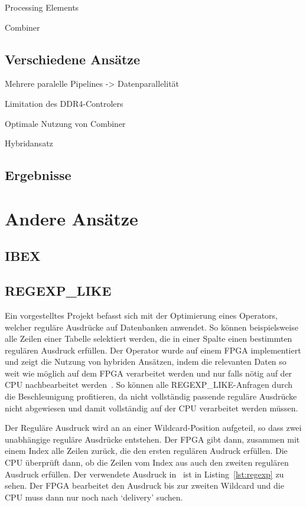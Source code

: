 \documentclass[conference]{IEEEtran}
\begin{document}
Processing Elements

Combiner



\subsection{Verschiedene Ansätze}

Mehrere paralelle Pipelines -> Datenparallelität

Limitation des DDR4-Controlers

Optimale Nutzung von Combiner

Hybridansatz



\subsection{Ergebnisse}

\section{Andere Ansätze}

\subsection{IBEX}

\subsection{REGEXP\_LIKE}
Ein vorgestelltes Projekt befasst sich mit der Optimierung eines Operators, welcher reguläre Ausdrücke auf Datenbanken anwendet. So können beispielsweise
alle Zeilen einer Tabelle selektiert werden, die in einer Spalte einen bestimmten regulären Ausdruck erfüllen. Der Operator wurde auf einem FPGA implementiert
und zeigt die Nutzung von hybriden Ansätzen, indem die relevanten Daten so weit wie möglich auf dem FPGA verarbeitet werden und nur falls nötig auf der CPU
nachbearbeitet werden~\cite{sidler_accelerating_2017}. So können alle REGEXP\_LIKE-Anfragen durch die Beschleunigung profitieren, da nicht vollständig passende
reguläre Ausdrücke nicht abgewiesen und damit vollständig auf der CPU verarbeitet werden müssen.

Der Reguläre Ausdruck wird an an einer Wildcard-Position aufgeteil, so dass zwei unabhängige reguläre Ausdrücke entstehen. Der FPGA gibt dann, zusammen mit einem Index
alle Zeilen zurück, die den ersten regulären Audruck erfüllen. Die CPU überprüft dann, ob die Zeilen vom Index aus auch den zweiten regulären Ausdruck erfüllen.
Der verwendete Ausdruck in~\cite{sidler_accelerating_2017} ist in Listing~\ref{lst:regexp} zu sehen. Der FPGA bearbeitet den Ausdruck bis zur zweiten
Wildcard und die CPU muss dann nur noch nach `delivery' suchen.
\end{document}
